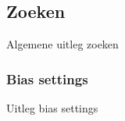 
\subsection{Zoeken}\label{zoeken}

Algemene uitleg zoeken 

\subsubsection{Bias settings}

Uitleg bias settings